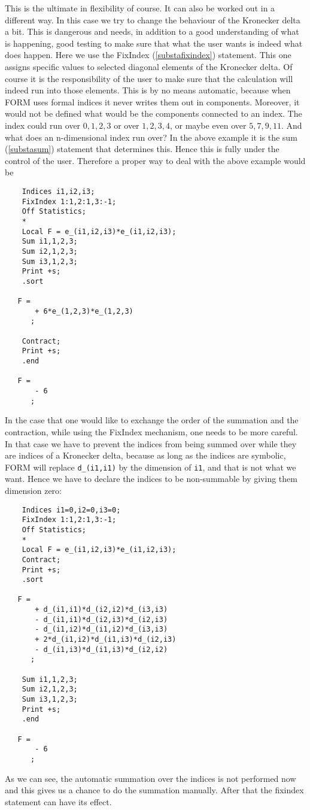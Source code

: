 This is the ultimate in flexibility of course. It can 
also be worked out in a different way. In this case we try to change the 
behaviour of the Kronecker delta a 
bit. This is dangerous and needs, in addition to a good 
understanding of what is happening, good testing to make sure that what the 
user wants is indeed what does happen. Here we use the 
FixIndex (\ref{substafixindex}) statement. This one assigns 
specific values to selected diagonal elements of the Kronecker delta. Of 
course it is the responsibility of the user to make sure that the 
calculation will indeed run into those elements. This is by no means 
automatic, because when FORM uses formal indices it never writes them out 
in components. Moreover, it would not be defined what would be the 
components connected to an index. The index could run over $0,1,2,3$ or 
over $1,2,3,4$, or maybe even over $5,7,9,11$. And what does an 
n-dimensional index run over? In the above example it is the sum 
(\ref{substasum}) statement that determines this. Hence this is fully under 
the control of the user. Therefore a proper way to deal with the above 
example would be
\begin{verbatim}
    Indices i1,i2,i3;
    FixIndex 1:1,2:1,3:-1;
    Off Statistics;
    *
    Local F = e_(i1,i2,i3)*e_(i1,i2,i3);
    Sum i1,1,2,3;
    Sum i2,1,2,3;
    Sum i3,1,2,3;
    Print +s;
    .sort

   F =
       + 6*e_(1,2,3)*e_(1,2,3)
      ;

    Contract;
    Print +s;
    .end

   F =
       - 6
      ;
\end{verbatim}
In the case that one would like to exchange the order of the summation and 
the contraction, while using the FixIndex mechanism, one needs to be more 
careful. In that case we have to prevent the indices from being summed over 
while they are indices of a Kronecker delta, because as long as the indices 
are symbolic, FORM will replace \verb:d_(i1,i1): by the dimension of 
\verb:i1:, and that is not what we want. Hence we have to declare the 
indices to be non-summable by giving them dimension zero:
\begin{verbatim}
    Indices i1=0,i2=0,i3=0;
    FixIndex 1:1,2:1,3:-1;
    Off Statistics;
    *
    Local F = e_(i1,i2,i3)*e_(i1,i2,i3);
    Contract;
    Print +s;
    .sort

   F =
       + d_(i1,i1)*d_(i2,i2)*d_(i3,i3)
       - d_(i1,i1)*d_(i2,i3)*d_(i2,i3)
       - d_(i1,i2)*d_(i1,i2)*d_(i3,i3)
       + 2*d_(i1,i2)*d_(i1,i3)*d_(i2,i3)
       - d_(i1,i3)*d_(i1,i3)*d_(i2,i2)
      ;

    Sum i1,1,2,3;
    Sum i2,1,2,3;
    Sum i3,1,2,3;
    Print +s;
    .end

   F =
       - 6
      ;
\end{verbatim}
As we can see, the automatic summation over the indices is not performed 
now and this gives us a chance to do the summation manually. After that the 
fixindex statement can have its effect. \hfill \vspace{2mm}

